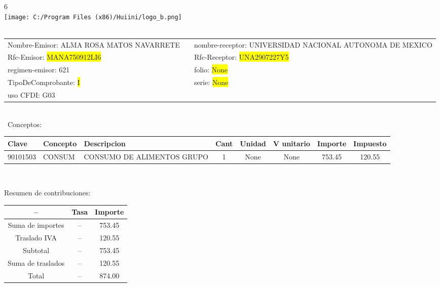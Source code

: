 \documentclass{article}
\begin{document}
\hspace{18cm} 6\\
\texttt{[image: C:/Program Files (x86)/Huiini/logo\_b.png]}
\bigskip\\\
\begin{tabular}{p{11cm}p{1cm}p{8cm}}

Nombre-Emisor: ALMA ROSA MATOS NAVARRETE && nombre-receptor: UNIVERSIDAD NACIONAL AUTONOMA DE MEXICO\\

Rfc-Emisor: \colorbox{yellow}{ MANA750912LI6 } & & Rfc-Receptor: \colorbox{yellow}{ UNA2907227Y5 }\\

regimen-emisor: 621 & & folio: \colorbox{yellow}{ None }\\

TipoDeComprobante: \colorbox{yellow}{ I } & & serie: \colorbox{yellow}{ None }\\

uso CFDI: G03\\



\end{tabular}
\bigskip\bigskip\bigskip\\\
Conceptos:\\
\begin{tabular}{|p{1.5cm}|p{3.6cm}|p{3.6cm}|c|c|c|c|c|}
\hline
Clave & Concepto & Descripcion & Cant & Unidad & V unitario & Importe & Impuesto \\
\hline

90101503 & CONSUM & CONSUMO DE ALIMENTOS   GRUPO & 1 & None & None & 753.45 &  120.55 \\
\hline

\end{tabular}\\
\bigskip
\begin{center}
Resumen de contribuciones:\\
\bigskip
\begin{tabular}{|c|c|c|}
\hline
 -- & Tasa & Importe\\
\hline

Suma de importes & -- & 753.45 \\
\hline

Traslado IVA & -- & 120.55 \\
\hline

Subtotal  & -- & 753.45 \\
\hline

Suma de traslados & -- & 120.55 \\
\hline

Total  & -- & 874.00 \\
\hline

\end{tabular}
\end{center}
\end{document}
